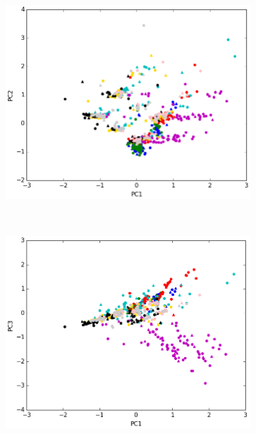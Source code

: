 \begin{figure}[ht!]	
	\begin{subfigure}[b]{0.5\textwidth}
		\includegraphics[width=\linewidth]{img/sanger/3dim-pc1-pc2.png}
	\end{subfigure}%
	~
	\begin{subfigure}[b]{0.5\textwidth}
		\includegraphics[width=\linewidth]{img/sanger/3dim-pc1-pc3.png}
	\end{subfigure}%
	\\
	\centering
	\begin{subfigure}[b]{0.5\textwidth}

\end{subfigure}
\end{figure}
